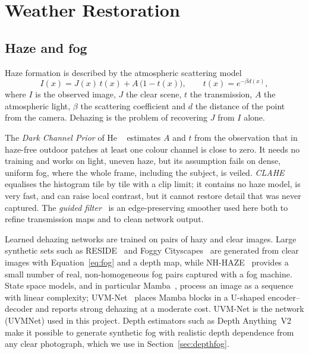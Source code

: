 \section{Weather Restoration}

\subsection{Haze and fog}

Haze formation is described by the atmospheric scattering
model~\cite{narasimhan2002vision}
\begin{equation}
  I(x) = J(x)\,t(x) + A\,\bigl(1 - t(x)\bigr), \qquad t(x) = e^{-\beta d(x)},
  \label{eq:fog}
\end{equation}
where $I$ is the observed image, $J$ the clear scene, $t$ the transmission,
$A$ the atmospheric light, $\beta$ the scattering coefficient and $d$ the
distance of the point from the camera. Dehazing is the problem of recovering
$J$ from $I$ alone.

The \emph{Dark Channel Prior} of He \etal~\cite{he2011dcp} estimates $A$ and
$t$ from the observation that in haze-free outdoor patches at least one colour
channel is close to zero. It needs no training and works on light, uneven haze,
but its assumption fails on dense, uniform fog, where the whole frame, including
the subject, is veiled. \emph{CLAHE}~\cite{zuiderveld1994clahe} equalises the
histogram tile by tile with a clip limit; it contains no haze model, is very
fast, and can raise local contrast, but it cannot restore detail that was
never captured. The \emph{guided filter}~\cite{he2013guided} is an edge-preserving
smoother used here both to refine transmission maps and to clean network
output.

Learned dehazing networks are trained on pairs of hazy and clear images.
Large synthetic sets such as RESIDE~\cite{li2019reside} and Foggy
Cityscapes~\cite{sakaridis2018foggy} are generated from clear images with
Equation~\eqref{eq:fog} and a depth map, while NH-HAZE~\cite{ancuti2020nhhaze}
provides a small number of real, non-homogeneous fog pairs captured with a
fog machine. State space models, and in particular
Mamba~\cite{gu2023mamba}, process an image as a sequence with linear
complexity; UVM-Net~\cite{zheng2024uvmnet} places Mamba blocks in a U-shaped
encoder--decoder and reports strong dehazing at a moderate cost. UVM-Net is
the network (UVMNet) used in this project. Depth estimators such as Depth
Anything~V2~\cite{yang2024depthanythingv2} make it possible to generate
synthetic fog with realistic depth dependence from any clear photograph,
which we use in Section~\ref{sec:depthfog}.

